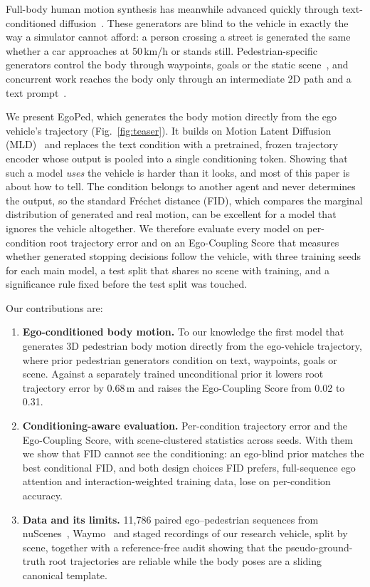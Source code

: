 \documentclass{ieeeoj}
\newcommand{\method}{EgoPed\xspace}
\begin{document}
Full-body human motion synthesis has meanwhile advanced quickly through text-conditioned diffusion~\cite{chen2023mld,tevet2023mdm,zhang2022motiondiffuse,guo2024momask}.
These generators are blind to the vehicle in exactly the way a simulator cannot afford: a person crossing a street is generated the same whether a car approaches at 50\,km/h or stands still.
Pedestrian-specific generators control the body through waypoints, goals or the static scene~\cite{rempe2023tracepace,liu2025pedgen}, and concurrent work reaches the body only through an intermediate 2D path and a text prompt~\cite{liu2026controlped}.

We present \method, which generates the body motion directly from the ego vehicle's trajectory (Fig.~\ref{fig:teaser}).
It builds on Motion Latent Diffusion (MLD)~\cite{chen2023mld} and replaces the text condition with a pretrained, frozen trajectory encoder whose output is pooled into a single conditioning token.
Showing that such a model \emph{uses} the vehicle is harder than it looks, and most of this paper is about how to tell.
The condition belongs to another agent and never determines the output, so the standard Fréchet distance (FID), which compares the marginal distribution of generated and real motion, can be excellent for a model that ignores the vehicle altogether.
We therefore evaluate every model on per-condition root trajectory error and on an Ego-Coupling Score that measures whether generated stopping decisions follow the vehicle, with three training seeds for each main model, a test split that shares no scene with training, and a significance rule fixed before the test split was touched.

Our contributions are:
\begin{enumerate}
\item \textbf{Ego-conditioned body motion.} To our knowledge the first model that generates 3D pedestrian body motion directly from the ego-vehicle trajectory, where prior pedestrian generators condition on text, waypoints, goals or scene. Against a separately trained unconditional prior it lowers root trajectory error by 0.68\,m and raises the Ego-Coupling Score from 0.02 to 0.31.
\item \textbf{Conditioning-aware evaluation.} Per-condition trajectory error and the Ego-Coupling Score, with scene-clustered statistics across seeds. With them we show that FID cannot see the conditioning: an ego-blind prior matches the best conditional FID, and both design choices FID prefers, full-sequence ego attention and interaction-weighted training data, lose on per-condition accuracy.
\item \textbf{Data and its limits.} 11{,}786 paired ego--pedestrian sequences from nuScenes~\cite{caesar2020nuscenes}, Waymo~\cite{sun2020waymo} and staged recordings of our research vehicle, split by scene, together with a reference-free audit showing that the pseudo-ground-truth root trajectories are reliable while the body poses are a sliding canonical template.
\end{enumerate}
\end{document}
